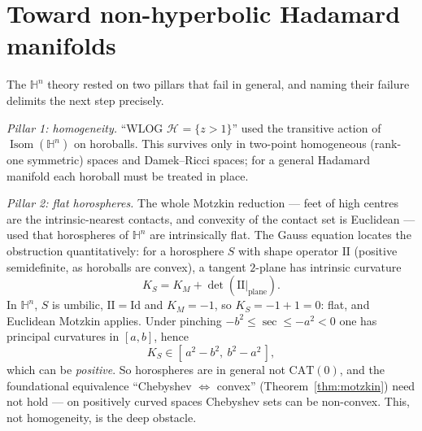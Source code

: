 \documentclass[11pt]{article}
\theoremstyle{remark}
\newcommand{\Hb}[1]{\mathcal{H}_{#1}}
\begin{document}
\section{Toward non-hyperbolic Hadamard manifolds}\label{sec:nonhyp}

The $\mathbb{H}^{n}$ theory rested on two pillars that fail in
general, and naming their failure delimits the next step precisely.

\emph{Pillar 1: homogeneity.} ``WLOG $\Hb{}=\{z>1\}$'' used the
transitive action of $\operatorname{Isom}(\mathbb{H}^{n})$ on
horoballs. This survives only in two-point homogeneous (rank-one
symmetric) spaces and Damek--Ricci spaces; for a general Hadamard
manifold each horoball must be treated in place.

\emph{Pillar 2: flat horospheres.} The whole Motzkin reduction --- feet
of high centres are the intrinsic-nearest contacts, and convexity of
the contact set is Euclidean --- used that horospheres of
$\mathbb{H}^{n}$ are intrinsically flat. The Gauss equation locates
the obstruction quantitatively: for a horosphere $S$ with shape
operator $\mathrm{II}$ (positive semidefinite, as horoballs are
convex), a tangent $2$-plane has intrinsic curvature
\[
K_{S}=K_{M}+\det(\mathrm{II}|_{\text{plane}}).
\]
In $\mathbb{H}^{n}$, $S$ is umbilic, $\mathrm{II}=\mathrm{Id}$ and
$K_{M}=-1$, so $K_{S}=-1+1=0$: flat, and Euclidean Motzkin applies.
Under pinching $-b^{2}\le\sec\le-a^{2}<0$ one has principal curvatures
in $[a,b]$, hence
\[
K_{S}\in[\,a^{2}-b^{2},\ b^{2}-a^{2}\,],
\]
which can be \emph{positive}. So horospheres are in general not
$\mathrm{CAT}(0)$, and the foundational equivalence
``Chebyshev $\Leftrightarrow$ convex'' (Theorem~\ref{thm:motzkin})
need not hold --- on positively curved spaces Chebyshev sets can be
non-convex. This, not homogeneity, is the deep obstacle.
\end{document}
